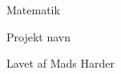 \documentclass[12pt, a4paper]{article}
\begin{document}
\begin{titlepage}
	\begin{center}
		{\huge Matematik}\\

		\vspace{0.5cm}

		{\large Projekt navn}\\

		\vspace{0.2cm}

		Lavet af Mads Harder

		\vspace{4cm}

	\end{center}
\end{titlepage}
\newpage

\thispagestyle{empty}
\renewcommand{\contentsname}{Indholdsfortegnelse}
\tableofcontents

\newpage
\setcounter{page}{1}
\end{document}

